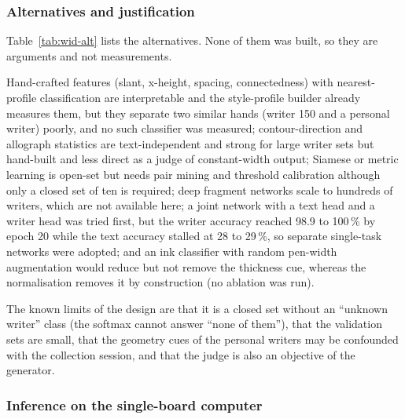 \subsubsection{Alternatives and justification}

Table~\ref{tab:wid-alt} lists the alternatives.
None of them was built, so they are arguments and not measurements.

Hand-crafted features (slant, x-height, spacing, connectedness) with nearest-profile classification are interpretable and the style-profile builder already measures them, but they separate two similar hands (writer 150 and a personal writer) poorly, and no such classifier was measured; contour-direction and allograph statistics \cite{bulacu2007} are text-independent and strong for large writer sets but hand-built and less direct as a judge of constant-width output; Siamese or metric learning is open-set but needs pair mining and threshold calibration although only a closed set of ten is required; deep fragment networks \cite{he2020} scale to hundreds of writers, which are not available here; a joint network with a text head and a writer head was tried first, but the writer accuracy reached 98.9 to 100\,\% by epoch 20 while the text accuracy stalled at 28 to 29\,\%, so separate single-task networks were adopted; and an ink classifier with random pen-width augmentation would reduce but not remove the thickness cue, whereas the normalisation removes it by construction (no ablation was run).

The known limits of the design are that it is a closed set without an ``unknown writer'' class (the softmax cannot answer ``none of them''), that the validation sets are small, that the geometry cues of the personal writers may be confounded with the collection session, and that the judge is also an objective of the generator.

\subsubsection{Inference on the single-board computer}

